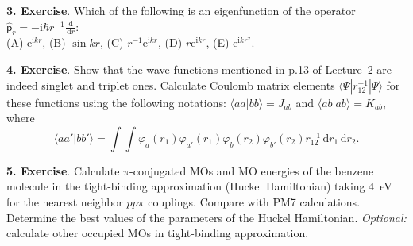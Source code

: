\documentclass{homework}
\newcommand{\rme}{\mathrm{e}}
\newcommand{\rmi}{\mathrm{i}}
\newcommand{\dif}{\,\mathrm{d}}
\newcommand{\op}[1]{\mathsf{\hat{#1}}}
\begin{document}
\bigskip

\textbf{3. Exercise}. Which of the following is an eigenfunction of the operator
$\op{p}_r=-\rmi\hbar r^{-1}\frac{\dif}{\dif r}$: \\ (A) $\rme^{\rmi kr}$, (B) $\sin kr$, (C) $r^{-1}\rme^{\rmi kr}$, (D) $r\rme^{\rmi kr}$, (E) $\rme^{\rmi kr^2}$.

\bigskip

\textbf{4. Exercise}. Show that the wave-functions mentioned in p.13 of Lecture~2 are indeed singlet and triplet ones. Calculate Coulomb matrix elements $\langle\Psi|r_{12}^{-1}|\Psi\rangle$ for these functions using the following notations: $\langle aa|bb\rangle=J_{ab}$ and $\langle ab|ab\rangle=K_{ab}$, where
$$ \langle aa'|bb'\rangle=\int\int\varphi_a(r_1)\varphi_{a'}(r_1)\varphi_b(r_2)\varphi_{b'}(r_2)r_{12}^{-1}\dif r_1\dif r_2.$$

\bigskip

\textbf{5. Exercise}. Calculate $\pi$-conjugated MOs and MO energies of the benzene molecule in the tight-binding approximation (Huckel Hamiltonian) taking 4~eV for the nearest neighbor $pp\pi$ couplings. Compare with PM7 calculations. Determine the best values of the parameters of the Huckel Hamiltonian. \emph{Optional:} calculate other occupied MOs in tight-binding approximation.
\end{document}
